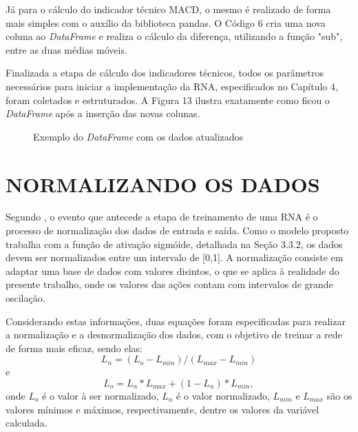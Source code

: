 Já para o cálculo do indicador técnico MACD, o mesmo é realizado de forma mais simples com o auxílio da biblioteca pandas. O Código 6 cria uma nova coluna ao \textit{DataFrame} e realiza o cálculo da diferença, utilizando a função "sub", entre as duas médias móveis.


Finalizada a etapa de cálculo dos indicadores técnicos, todos os parâmetros necessários para iniciar a implementação da RNA, especificados no Capítulo 4, foram coletados e estruturados. A Figura 13 ilustra exatamente como ficou o \textit{DataFrame} após a inserção das novas colunas.
\begin{figure}[h]
	\centering
	\caption{Exemplo do \textit{DataFrame} com os dados atualizados}
	\label{exec-dados-formatados}	
\end{figure}

\section{NORMALIZANDO OS DADOS}
Segundo , o evento que antecede a etapa de treinamento de uma RNA é o processo de normalização dos dados de entrada e saída. Como o modelo proposto trabalha com a função de ativação sigmóide, detalhada na Seção 3.3.2, os dados devem ser normalizados entre um intervalo de [0,1]. A normalização consiste em adaptar uma base de dados com valores disintos, o que se aplica à realidade do presente trabalho, onde os valores das ações contam com intervalos de grande oscilação.

Considerando estas informações, duas equações foram especificadas para realizar a normalização e a desnormalização dos dados, com o objetivo de treinar a rede de forma mais eficaz, sendo elas:
\begin{equation}\label{eq:eq-normalizacao}
L_n = (L_o - L_{min}) / (L_{max} - L_{min})
\end{equation}
e
\begin{equation}\label{eq:eq-desnormalizacao}
L_o =  L_n * L_{max} + (1 - L_n) * L_{min},
\end{equation}
onde $L_o$ é o valor à ser normalizado, $L_n$ é o valor normalizado, $L_{min}$ e $L_{max}$ são os valores mínimos e máximos, respectivamente, dentre os valores da variável calculada.

